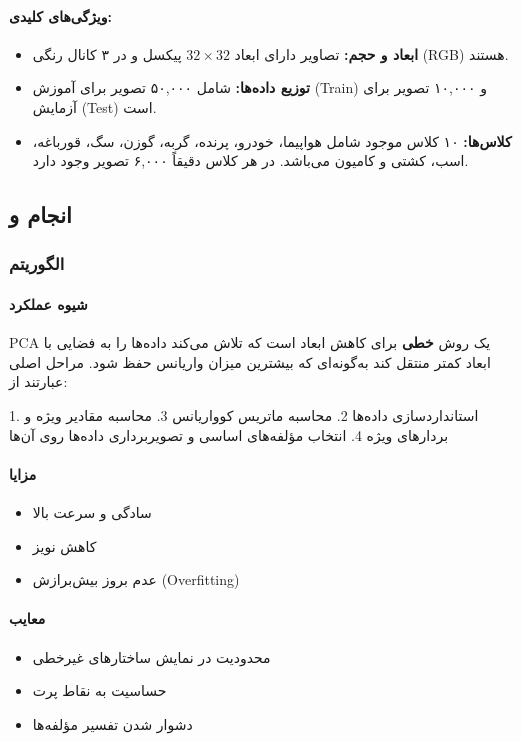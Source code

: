\documentclass{article}
\begin{document}
\paragraph{ویژگی‌های کلیدی:}
\begin{itemize}
	\item \textbf{ابعاد و حجم:} تصاویر دارای ابعاد $32 \times 32$ پیکسل و در ۳ کانال رنگی (RGB) هستند.
	\item \textbf{توزیع داده‌ها:} شامل ۵۰,۰۰۰ تصویر برای آموزش (Train) و ۱۰,۰۰۰ تصویر برای آزمایش (Test) است.
	\item \textbf{کلاس‌ها:} ۱۰ کلاس موجود شامل هواپیما، خودرو، پرنده، گربه، گوزن، سگ، قورباغه، اسب، کشتی و کامیون می‌باشد. در هر کلاس دقیقاً ۶,۰۰۰ تصویر وجود دارد.
\end{itemize}
\subsection{انجام  و }
\subsubsection{الگوریتم }

\paragraph{شیوه عملکرد}
PCA یک روش \textbf{خطی} برای کاهش ابعاد است که تلاش می‌کند داده‌ها را به فضایی با ابعاد کمتر منتقل کند به‌گونه‌ای که بیشترین میزان واریانس حفظ شود. مراحل اصلی عبارتند از:

1. استانداردسازی داده‌ها  
2. محاسبه ماتریس کوواریانس  
3. محاسبه مقادیر ویژه و بردارهای ویژه  
4. انتخاب مؤلفه‌های اساسی و تصویربرداری داده‌ها روی آن‌ها  

\paragraph{مزایا}
\begin{itemize}
	\item سادگی و سرعت بالا  
	\item کاهش نویز  
	\item عدم بروز بیش‌برازش (Overfitting)  
\end{itemize}

\paragraph{معایب}
\begin{itemize}
	\item محدودیت در نمایش ساختارهای غیرخطی  
	\item حساسیت به نقاط پرت  
	\item دشوار شدن تفسیر مؤلفه‌ها  
\end{itemize}
\end{document}
